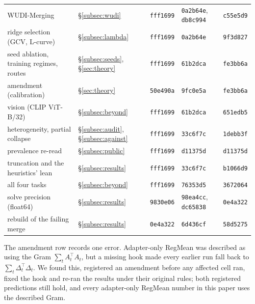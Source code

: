 \begin{table}[pos=h]
\begin{tabular}{p{5.2cm}llp{2.2cm}l}
\addlinespace
WUDI-Merging & \S\ref{subsec:wudi} & \texttt{fff1699} & \texttt{0a2b64e}, \texttt{db8c994} & \texttt{c55e5d9} \\
ridge selection (GCV, L-curve) & \S\ref{subsec:lambda} & \texttt{fff1699} & \texttt{0a2b64e} & \texttt{9f3d827} \\
seed ablation, training regimes, routes & \S\ref{subsec:seeds}, \S\ref{sec:theory} & \texttt{fff1699} & \texttt{61b2dca} & \texttt{fe3bb6a} \\
\quad amendment (calibration) & \S\ref{sec:theory} & \texttt{50e490a} & \texttt{9fc0e5a} & \texttt{fe3bb6a} \\
vision (CLIP ViT-B/32) & \S\ref{subsec:beyond} & \texttt{fff1699} & \texttt{61b2dca} & \texttt{651edb5} \\
heterogeneity, partial collapse & \S\ref{subsec:audit}, \S\ref{subsec:against} & \texttt{fff1699} & \texttt{33c6f7c} & \texttt{1debb3f} \\
\quad prevalence re-read & \S\ref{subsec:public} & \texttt{fff1699} & \texttt{d11375d} & \texttt{d11375d} \\
truncation and the heuristics' lean & \S\ref{subsec:results} & \texttt{fff1699} & \texttt{33c6f7c} & \texttt{b1066d9} \\
all four tasks & \S\ref{subsec:beyond} & \texttt{fff1699} & \texttt{76353d5} & \texttt{3672064} \\
solve precision (float64) & \S\ref{subsec:results} & \texttt{9830e06} & \texttt{98ea4cc}, \texttt{dc65838} & \texttt{0e4a322} \\
\quad rebuild of the failing merge & \S\ref{subsec:results} & \texttt{0e4a322} & \texttt{6d436cf} & \texttt{58d5275} \\
\bottomrule
\end{tabular}
\end{table}

The amendment row records one error. Adapter-only RegMean was described
as using the Gram $\sum_t A_t^\top A_t$, but a missing hook made every earlier
run fall back to $\sum_t \Delta_t^\top\Delta_t$. We found this, registered an
amendment before any affected cell ran, fixed the hook and re-ran the results
under their original rules; both registered predictions still hold, and every
adapter-only RegMean number in this paper uses the described Gram.

